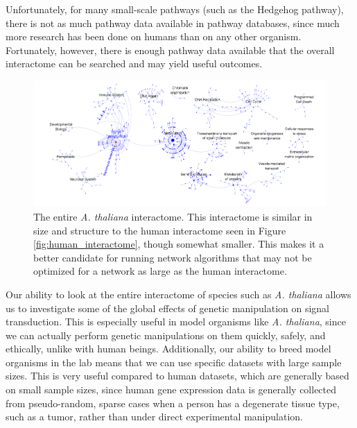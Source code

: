 \documentclass[12pt,twoside]{reedthesis}
\theoremstyle{definition}
\begin{document}
   Unfortunately, for many small-scale pathways (such as the Hedgehog pathway), there is not as much pathway data available in pathway databases, since much more research has been done on humans than on any other organism. Fortunately, however, there is enough pathway data available that the overall interactome can be searched and may yield useful outcomes.\par

   \begin{figure}[h]
     \begin{center}
       \includegraphics[width=\textwidth]{at_interactome}
     \caption[The entire \textit{A. thaliana} interactome.]{The entire \textit{A. thaliana}  interactome. This interactome is similar in size and structure to the human interactome seen in Figure \ref{fig:human_interactome}, though somewhat smaller. This makes it a better candidate for running network algorithms that may not be optimized for a network as large as the human interactome.}
     \label{fig:at_interactome}
     \end{center}
   \end{figure}

   Our ability to look at the entire interactome of species such as \textit{A. thaliana} allows us to investigate some of the global effects of genetic manipulation on signal transduction. This is especially useful in model organisms like \textit{A. thaliana}, since we can actually perform genetic manipulations on them quickly, safely, and ethically, unlike with human beings. Additionally, our ability to breed model organisms in the lab means that we can use specific datasets with large sample sizes. This is very useful compared to human datasets, which are generally based on small sample sizes, since human gene expression data is generally collected from pseudo-random, sparse cases when a person has a degenerate tissue type, such as a tumor, rather than under direct experimental manipulation.\par
\end{document}
